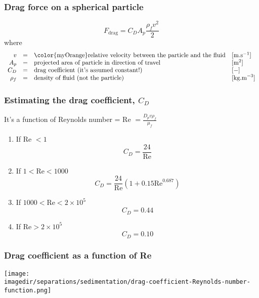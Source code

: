 \begin{frame}\frametitle{Drag force on  a spherical particle}
	\[
	 	F_\text{drag} = C_D A_p \frac{\rho_f v^2}{2}
	\]
	where
	\[
		\begin{array}{rcll}
			v	    &=& \text{{\color{myOrange}relative} velocity between the particle and the fluid} &[\text{m.s}^{-1}] \\
			A_p     &=& \text{projected area of particle in direction of travel} &[\text{m}^2] \\
			C_D	    &=& \text{drag coefficient (it's assumed constant!)} &[-] \\
			\rho_f  &=& \text{density of fluid (not the particle)}  &[\text{kg.m}^{-3}]
		\end{array}
	\]
\end{frame}

\begin{frame}\frametitle{Estimating the drag coefficient, $C_D$}
	It's a function of Reynolds number = Re $= \displaystyle \frac{D_p v \rho_f}{\mu_f}$ \\
	\begin{enumerate} \label{CD-rules}
		\item	If Re $< 1$
				\[
					C_D = \frac{24}{\text{Re}}
				\]

		\item	If $1 < \text{Re} < \text{1000}$
				\[
					C_D = \frac{24}{\text{Re}}\left(1 + 0.15 \text{Re}^{0.687} \right)
				\]
		\item	If $\text{1000} < \text{Re} < 2\times10^5 $
				\[
					C_D = 0.44
				\]
		\item	If $\text{Re} > 2\times10^5 $
				\[
					C_D = 0.10
				\]
	\end{enumerate}
\end{frame}

\begin{frame}\frametitle{Drag coefficient as a function of Re}
	\begin{center}
		\texttt{[image: \\imagedir/separations/sedimentation/drag-coefficient-Reynolds-number-function.png]}
	\end{center}
\end{frame}

